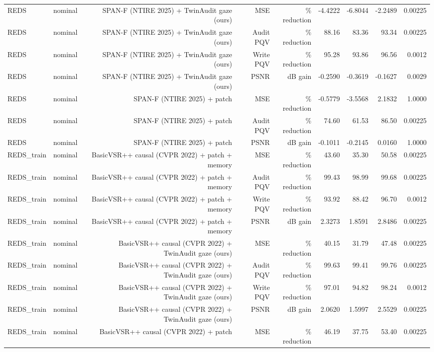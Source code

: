 \begin{table}[t]
\begin{tabular}{llrrrrrrr}
REDS & nominal & SPAN-F (NTIRE 2025) + TwinAudit gaze (ours) & MSE & \% reduction & -4.4222 & -6.8044 & -2.2489 & 0.00225 \\
REDS & nominal & SPAN-F (NTIRE 2025) + TwinAudit gaze (ours) & Audit PQV & \% reduction & 88.16 & 83.36 & 93.34 & 0.00225 \\
REDS & nominal & SPAN-F (NTIRE 2025) + TwinAudit gaze (ours) & Write PQV & \% reduction & 95.28 & 93.86 & 96.56 & 0.0012 \\
REDS & nominal & SPAN-F (NTIRE 2025) + TwinAudit gaze (ours) & PSNR & dB gain & -0.2590 & -0.3619 & -0.1627 & 0.0029 \\
REDS & nominal & SPAN-F (NTIRE 2025) + patch & MSE & \% reduction & -0.5779 & -3.5568 & 2.1832 & 1.0000 \\
REDS & nominal & SPAN-F (NTIRE 2025) + patch & Audit PQV & \% reduction & 74.60 & 61.53 & 86.50 & 0.00225 \\
REDS & nominal & SPAN-F (NTIRE 2025) + patch & PSNR & dB gain & -0.1011 & -0.2145 & 0.0160 & 1.0000 \\
REDS\_train & nominal & BasicVSR++ causal (CVPR 2022) + patch + memory & MSE & \% reduction & 43.60 & 35.30 & 50.58 & 0.00225 \\
REDS\_train & nominal & BasicVSR++ causal (CVPR 2022) + patch + memory & Audit PQV & \% reduction & 99.43 & 98.99 & 99.68 & 0.00225 \\
REDS\_train & nominal & BasicVSR++ causal (CVPR 2022) + patch + memory & Write PQV & \% reduction & 93.92 & 88.42 & 96.70 & 0.0012 \\
REDS\_train & nominal & BasicVSR++ causal (CVPR 2022) + patch + memory & PSNR & dB gain & 2.3273 & 1.8591 & 2.8486 & 0.00225 \\
REDS\_train & nominal & BasicVSR++ causal (CVPR 2022) + TwinAudit gaze (ours) & MSE & \% reduction & 40.15 & 31.79 & 47.48 & 0.00225 \\
REDS\_train & nominal & BasicVSR++ causal (CVPR 2022) + TwinAudit gaze (ours) & Audit PQV & \% reduction & 99.63 & 99.41 & 99.76 & 0.00225 \\
REDS\_train & nominal & BasicVSR++ causal (CVPR 2022) + TwinAudit gaze (ours) & Write PQV & \% reduction & 97.01 & 94.82 & 98.24 & 0.0012 \\
REDS\_train & nominal & BasicVSR++ causal (CVPR 2022) + TwinAudit gaze (ours) & PSNR & dB gain & 2.0620 & 1.5997 & 2.5529 & 0.00225 \\
REDS\_train & nominal & BasicVSR++ causal (CVPR 2022) + patch & MSE & \% reduction & 46.19 & 37.75 & 53.40 & 0.00225 \\

\end{tabular}
\end{table}
